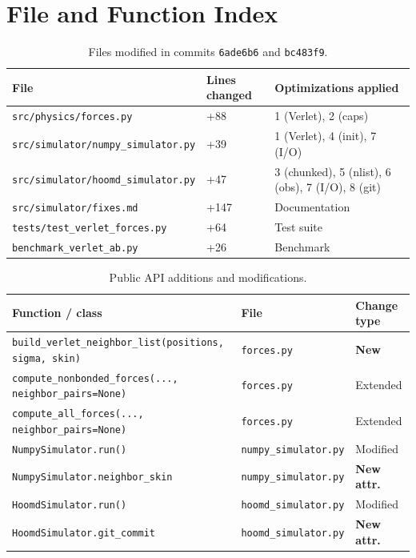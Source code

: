 \documentclass[12pt,a4paper]{article}
\newcommand{\code}[1]{\texttt{#1}}
\begin{document}
\appendix

\section{File and Function Index}
\label{app:index}

\begin{table}[h]
\centering
\caption{Files modified in commits \texttt{6ade6b6} and \texttt{bc483f9}.}
\label{tab:files}
\begin{tabular}{lll}
\toprule
File & Lines changed & Optimizations applied \\
\midrule
\code{src/physics/forces.py}            & +88 & 1 (Verlet), 2 (caps) \\
\code{src/simulator/numpy\_simulator.py}& +39 & 1 (Verlet), 4 (init), 7 (I/O) \\
\code{src/simulator/hoomd\_simulator.py}& +47 & 3 (chunked), 5 (nlist), 6 (obs), 7 (I/O), 8 (git) \\
\code{src/simulator/fixes.md}           & +147 & Documentation \\
\code{tests/test\_verlet\_forces.py}    & +64 & Test suite \\
\code{benchmark\_verlet\_ab.py}         & +26 & Benchmark \\
\bottomrule
\end{tabular}
\end{table}

\begin{table}[h]
\centering
\caption{Public API additions and modifications.}
\label{tab:api}
\begin{tabular}{lll}
\toprule
Function / class & File & Change type \\
\midrule
\code{build\_verlet\_neighbor\_list(positions, sigma, skin)} & \code{forces.py} & \textbf{New} \\
\code{compute\_nonbonded\_forces(..., neighbor\_pairs=None)} & \code{forces.py} & Extended \\
\code{compute\_all\_forces(..., neighbor\_pairs=None)} & \code{forces.py} & Extended \\
\code{NumpySimulator.run()} & \code{numpy\_simulator.py} & Modified \\
\code{NumpySimulator.neighbor\_skin} & \code{numpy\_simulator.py} & \textbf{New attr.} \\
\code{HoomdSimulator.run()} & \code{hoomd\_simulator.py} & Modified \\
\code{HoomdSimulator.git\_commit} & \code{hoomd\_simulator.py} & \textbf{New attr.} \\
\bottomrule
\end{tabular}
\end{table}
\end{document}
